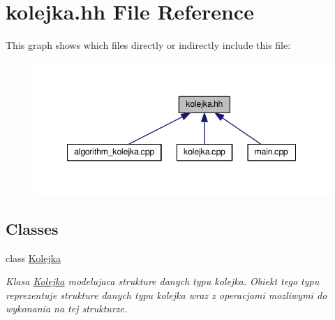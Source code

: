 \hypertarget{kolejka_8hh}{}\section{kolejka.\+hh File Reference}
\label{kolejka_8hh}
This graph shows which files directly or indirectly include this file\+:\nopagebreak
\begin{figure}[H]
\begin{center}
\leavevmode
\includegraphics[width=348pt]{kolejka_8hh__dep__incl}
\end{center}
\end{figure}
\subsection*{Classes}
\begin{DoxyCompactItemize}
\item 
class \hyperlink{class_kolejka}{Kolejka}
\begin{DoxyCompactList}\small\item\em Klasa \hyperlink{class_kolejka}{Kolejka} modelujaca strukture danych typu kolejka. Obiekt tego typu reprezentuje strukture danych typu kolejka wraz z operacjami mozliwymi do wykonania na tej strukturze. \end{DoxyCompactList}\end{DoxyCompactItemize}
